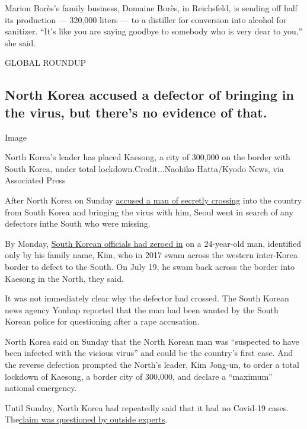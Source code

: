Marion Borès's family business, Domaine Borès, in Reichsfeld, is sending
off half its production --- 320,000 liters --- to a distiller for
conversion into alcohol for sanitizer. ``It's like you are saying
goodbye to somebody who is very dear to you,'' she said.

GLOBAL ROUNDUP

\hypertarget{north-korea-accused-a-defector-of-bringing-in-the-virus-but-theres-no-evidence-of-that}{%
\subsection{North Korea accused a defector of bringing in the virus, but
there's no evidence of
that.}\label{north-korea-accused-a-defector-of-bringing-in-the-virus-but-theres-no-evidence-of-that}}

Image

North Korea's leader has placed Kaesong, a city of 300,000 on the border
with South Korea, under total lockdown.Credit...Naohiko Hatta/Kyodo
News, via Associated Press

After North Korea on Sunday
\href{https://www.nytimes.com/2020/07/25/world/asia/north-korea-coronavirus-kim-jong-un.html}{accused
a man of secretly crossing} into the country from South Korea and
bringing the virus with him, Seoul went in search of any defectors ​in
​the South who were missing.

By Monday,
\href{https://www.nytimes.com/2020/07/27/world/asia/north-korea-defector-coronavirus.html}{South
Korean officials had zeroed in} on a 24-year-old man, identified only by
his family name, Kim, who in 2017 swam across the western inter-Korea
border to defect to the South. On July 19, he swam back across the
border into Kaesong in the North, they said.

It was not immediately clear why the defector had crossed. The South
Korean news agency Yonhap reported that the man had been wanted by the
South Korean police for questioning after a rape accusation.

North Korea said on Sunday that the North Korean man was ``suspected to
have been infected with the vicious virus'' and could be the country's
first case. And the reverse defection prompted the North's leader, Kim
Jong-un, to order a total lockdown of Kaesong, a border city of 300,000,
and declare a ``maximum'' national emergency.

Until Sunday, North Korea had ​repeatedly ​said that it had no Covid-19
cases.
The\href{https://www.nytimes.com/2020/03/31/world/asia/north-korea-coronavirus.html?action=click\&module=RelatedLinks\&pgtype=Article}{claim
was questioned by outside experts}.

